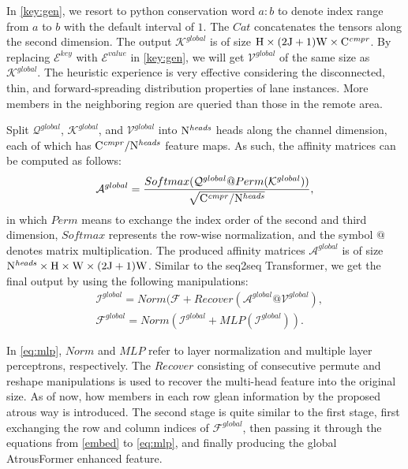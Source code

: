 \documentclass[preprint,12pt,review]{elsarticle}
\begin{document}
In \eqref{key:gen}, we resort to python conservation word $a:b$ to denote index range from $a$ to $b$ with the default interval of $1$. The $Cat$ concatenates the tensors along the second dimension. The output $\mathcal{K}^{global}$ is of size $\rm{H}\times (2\rm{J}+1)\rm{W} \times \rm{C}^{\it{cmpr}}$. By replacing $\mathcal{E}^{key}$ with $\mathcal{E}^{value}$ in \eqref{key:gen}, we will get $\mathcal{V}^{global}$ of the same size as $\mathcal{K}^{global}$. The heuristic experience is very effective considering the disconnected, thin, and forward-spreading distribution properties of lane instances. More members in the neighboring region are queried than those in the remote area.


Split $\mathcal{Q}^{global}$, $\mathcal{K}^{global}$, and $\mathcal{V}^{global}$ into $\rm{N}^{\it{heads}}$ heads along the channel dimension, each of which has $\rm{C}^{\it{cmpr}}/\rm{N}^{\it{heads}}$ feature maps. As such, the affinity matrices can be computed as follows:
\begin{equation}
	\mathcal{A}^{global} = \frac{Softmax(\mathcal{Q}^{global}@Perm(\mathcal{K}^{global}))}{\sqrt{\rm{\rm{C}^{\it{cmpr}}/N^{\it{heads}}}}},
\end{equation}
in which $Perm$ means to exchange the index order of the second and third dimension, $Softmax$ represents the row-wise normalization, and the symbol $@$ denotes matrix multiplication. The produced affinity matrices $\mathcal{A}^{global}$ is of size $\rm{N^{\it{heads}} \times H \times W \times (2J+1)W}$. Similar to the seq2seq Transformer, we get the final output by using the following manipulations:
\begin{align}
	\label{eq:mlp}
	&\mathcal{I}^{global} = Norm(\mathcal{F} + Recover(\mathcal{A}^{global}@\mathcal{V}^{global}), \nonumber \\
	&\mathcal{F}^{global} = Norm(\mathcal{I}^{global} + MLP(\mathcal{I}^{global})). 
\end{align}

In \eqref{eq:mlp}, $Norm$ and $MLP$ refer to layer normalization and multiple layer perceptrons, respectively. The $Recover$ consisting of consecutive permute and reshape manipulations is used to recover the multi-head feature into the original size. As of now, how members in each row glean information by the proposed atrous way is introduced. The second stage is quite similar to the first stage, first exchanging the row and column indices of $\mathcal{F}^{global}$, then passing it through the equations from \eqref{embed} to \eqref{eq:mlp}, and finally producing the global AtrousFormer enhanced feature.
\end{document}
